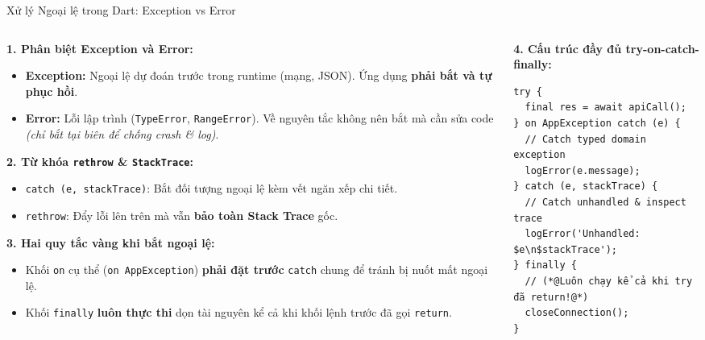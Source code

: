 \documentclass[aspectratio=169, 10pt]{beamer}
\begin{document}
\begin{frame}[fragile]{Xử lý Ngoại lệ trong Dart: Exception vs Error}
  \vspace{-0.35cm}
  \begin{columns}[t,onlytextwidth]
    \begin{column}{0.49\textwidth}
      \footnotesize
      \textbf{1. Phân biệt Exception và Error:}
      \begin{itemize}
        \item \textbf{Exception:} Ngoại lệ dự đoán trước trong runtime (mạng, JSON). Ứng dụng \textbf{phải bắt và tự phục hồi}.
        \item \textbf{Error:} Lỗi lập trình (\texttt{TypeError}, \texttt{RangeError}). Về nguyên tắc không nên bắt mà cần sửa code \textit{(chỉ bắt tại biên để chống crash \& log)}.
      \end{itemize}

      \vspace{0.05cm}
      \textbf{2. Từ khóa \texttt{rethrow} \& \texttt{StackTrace}:}
      \begin{itemize}
        \item \texttt{catch (e, stackTrace)}: Bắt đối tượng ngoại lệ kèm vết ngăn xếp chi tiết.
        \item \texttt{rethrow}: Đẩy lỗi lên trên mà vẫn \textbf{bảo toàn Stack Trace} gốc.
      \end{itemize}

      \vspace{0.05cm}
      \textbf{3. Hai quy tắc vàng khi bắt ngoại lệ:}
      \begin{itemize}
        \item Khối \texttt{on} cụ thể (\texttt{on AppException}) \textbf{phải đặt trước} \texttt{catch} chung để tránh bị nuốt mất ngoại lệ.
        \item Khối \texttt{finally} \textbf{luôn thực thi} dọn tài nguyên kể cả khi khối lệnh trước đã gọi \texttt{return}.
      \end{itemize}
    \end{column}

    \begin{column}{0.49\textwidth}
      \footnotesize\textbf{4. Cấu trúc đầy đủ try-on-catch-finally:}
      \begin{lstlisting}[basicstyle=\ttfamily\scriptsize\color{black}, columns=flexible]
try {
  final res = await apiCall();
} on AppException catch (e) {
  // Catch typed domain exception
  logError(e.message);
} catch (e, stackTrace) {
  // Catch unhandled & inspect trace
  logError('Unhandled: $e\n$stackTrace');
} finally {
  // (*@Luôn chạy kể cả khi try đã return!@*)
  closeConnection();
}
      \end{lstlisting}
    \end{column}
  \end{columns}
\end{frame}
\end{document}
